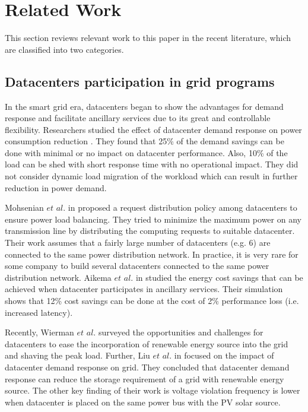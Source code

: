 \section{Related Work}
\label{sec:related}

This section reviews relevant work to this paper in the recent literature, which are classified into two categories.

\subsection{Datacenters participation in grid programs}

In the smart grid era, datacenters began to show the advantages for demand response and facilitate ancillary services due to its great and controllable flexibility. Researchers studied the effect of datacenter demand response on power consumption reduction \cite{lbnl12shortstudy, lbnl12report}. They found that 25\% of the demand savings can be done with minimal or no impact on datacenter performance. Also, 10\% of the load can be shed with short response time with no operational impact. They did not consider dynamic load migration of the workload which can result in further reduction in power demand. 	

Mohsenian $\textit{et al.}$ in \cite{Mohsenian-Rad10grid} proposed a request distribution policy among datacenters to ensure power load balancing. They tried to minimize the maximum power on any transmission line by distributing the computing requests to suitable datacenter. Their work assumes that a fairly large number of datacenters (e.g. 6) are connected to the same power distribution network. In practice, it is very rare for some company to build several datacenters connected to the same power distribution network.
Aikema $\textit{et al.}$ in \cite{Aikema12} studied the energy cost savings that can be achieved when datacenter participates in ancillary services. Their simulation shows that 12\% cost savings can be done at the cost of 2\% performance loss (i.e. increased latency).

Recently, Wierman $\textit{et al.}$ \cite{AdamWierman2014} surveyed the opportunities and challenges for datacenters to ease the incorporation of renewable energy source into the grid and shaving the peak load. Further, Liu $\textit{et al.}$ in \cite{liu2014pricing} focused on the impact of datacenter demand response on grid. They concluded that datacenter demand response can reduce the storage requirement of a grid with renewable energy source. The other key finding of their work is voltage violation frequency is lower when datacenter is placed on the same power bus with the PV solar source.

